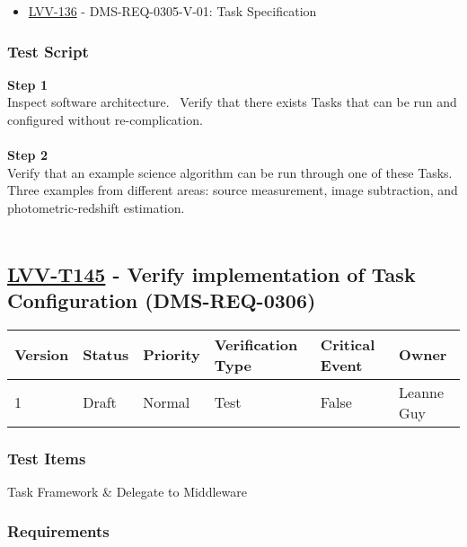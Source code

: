 \begin{itemize}
\tightlist
\item
  \href{https://jira.lsstcorp.org/browse/LVV-136}{LVV-136} -
  DMS-REQ-0305-V-01: Task Specification
\end{itemize}

\hypertarget{test-script-121}{%
\subsubsection{Test Script}\label{test-script-121}}

\textbf{Step 1}\\
Inspect software architecture. ~Verify that there exists Tasks that can
be run and configured without re-complication.\\
~\\
\textbf{Step 2}\\
Verify that an example science algorithm can be run through one of these
Tasks.~ Three examples from different areas: source measurement, image
subtraction, and photometric-redshift estimation.\\
~\\

\hypertarget{lvv-t145---verify-implementation-of-task-configuration-dms-req-0306}{%
\subsection{\texorpdfstring{\href{https://jira.lsstcorp.org/secure/Tests.jspa\#/testCase/LVV-T145}{LVV-T145}
- Verify implementation of Task Configuration
(DMS-REQ-0306)}{LVV-T145 - Verify implementation of Task Configuration (DMS-REQ-0306)}}\label{lvv-t145---verify-implementation-of-task-configuration-dms-req-0306}}

\begin{longtable}[]{@{}llllll@{}}
\toprule
Version & Status & Priority & Verification Type & Critical Event &
Owner\tabularnewline
\midrule
\endhead
1 & Draft & Normal & Test & False & Leanne Guy\tabularnewline
\bottomrule
\end{longtable}

\hypertarget{test-items-121}{%
\subsubsection{Test Items}\label{test-items-121}}

Task Framework \& Delegate to Middleware

\hypertarget{requirements-122}{%
\subsubsection{Requirements}\label{requirements-122}}

